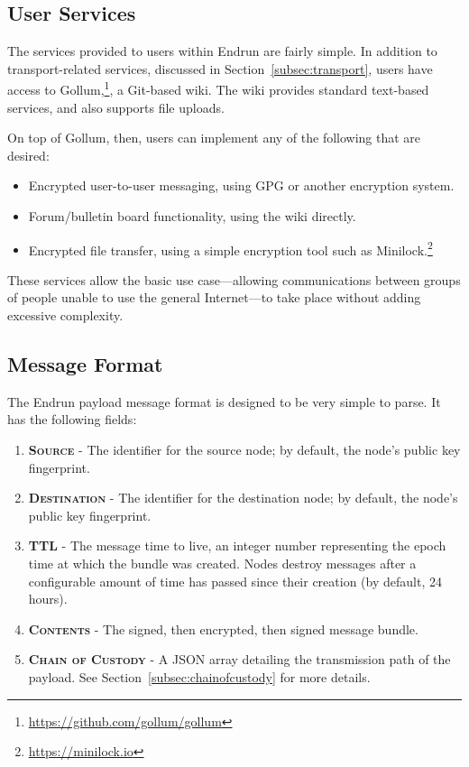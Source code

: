 \documentclass[12pt]{article}
\begin{document}
  \subsection{User Services}
  
  The services provided to users within Endrun are fairly simple. In addition to transport-related services, discussed in Section~\ref{subsec:transport}, users have access to Gollum,\footnote{\url{https://github.com/gollum/gollum}}, a Git-based wiki. The wiki provides standard text-based services, and also supports file uploads.
  
  On top of Gollum, then, users can implement any of the following that are desired:
  \begin{itemize}
    \item Encrypted user-to-user messaging, using GPG or another encryption system.
    \item Forum/bulletin board functionality, using the wiki directly.
    \item Encrypted file transfer, using a simple encryption tool such as Minilock.\footnote{\url{https://minilock.io}}
  \end{itemize}
  
  These services allow the basic use case---allowing communications between groups of people unable to use the general Internet---to take place without adding excessive complexity.
  
  \subsection{Message Format}
  
  The Endrun payload message format is designed to be very simple to parse. It has the following fields:
  
  \begin{enumerate}
    \item \textbf{\textsc{Source}} - The identifier for the source node; by default, the node's public key fingerprint. 
    \item \textbf{\textsc{Destination}} - The identifier for the destination node; by default, the node's public key fingerprint.
    \item \textbf{\textsc{TTL}} - The message time to live, an integer number representing the epoch time at which the bundle was created. Nodes destroy messages after a configurable amount of time has passed since their creation (by default, 24 hours).
    \item \textbf{\textsc{Contents}} - The signed, then encrypted, then signed message bundle.
    \item \textbf{\textsc{Chain of Custody}} - A JSON array detailing the transmission path of the payload. See Section~\ref{subsec:chainofcustody} for more details.

    \end{enumerate}
    
\end{document}
